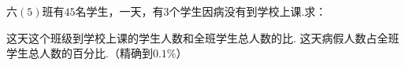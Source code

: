 六$(5)$班有$45$名学生，一天，有$3$个学生因病没有到学校上课.求：

\begin{subquestions}
\subquestion 这天这个班级到学校上课的学生人数和全班学生总人数的比.
\subquestion 这天病假人数占全班学生总人数的百分比.（精确到$0.1\%$）

\end{subquestions}
